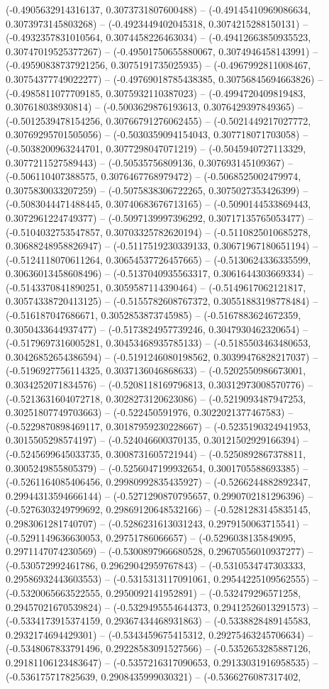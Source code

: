 (-0.4905632914316137, 0.3073731807600488) -- (-0.49145410969086634, 0.3073973145803268) -- (-0.4923449402045318, 0.3074215288150131) -- (-0.4932357831010564, 0.3074458226463034) -- (-0.49412663850935523, 0.30747019525377267) -- (-0.49501750655880067, 0.3074946458143991) -- (-0.49590838737921256, 0.3075191735025935) -- (-0.4967992811008467, 0.30754377749022277) -- (-0.49769018785438385, 0.30756845694663826) -- (-0.4985811077709185, 0.3075932110387023) -- (-0.4994720409819483, 0.307618038930814) -- (-0.5003629876193613, 0.3076429397849365) -- (-0.5012539478154256, 0.30766791276062455) -- (-0.5021449217027772, 0.30769295701505056) -- (-0.5030359094154043, 0.307718071703058) -- (-0.5038200963244701, 0.3077298047071219) -- (-0.5045940727113329, 0.3077211527589443) -- (-0.50535756809136, 0.307693145109367) -- (-0.506110407388575, 0.3076467768979472) -- (-0.5068525002479974, 0.3075830033207259) -- (-0.5075838306722265, 0.3075027353426399) -- (-0.5083044471488445, 0.30740683676713165) -- (-0.5090144533869443, 0.3072961224749377) -- (-0.5097139997396292, 0.30717135765053477) -- (-0.5104032753547857, 0.30703325782620194) -- (-0.5110825010685278, 0.30688248958826947) -- (-0.5117519230339133, 0.30671967180651194) -- (-0.5124118070611264, 0.30654537726457665) -- (-0.5130624336335599, 0.30636013458608496) -- (-0.5137040935563317, 0.3061644303669334) -- (-0.5143370841890251, 0.3059587114390464) -- (-0.5149617062121817, 0.30574338720413125) -- (-0.5155782608767372, 0.30551883198778484) -- (-0.516187047686671, 0.3052853873745985) -- (-0.5167883624672359, 0.3050433644937477) -- (-0.5173824957739246, 0.3047930462320654) -- (-0.5179697316005281, 0.30453468935785133) -- (-0.5185503463480653, 0.30426852654386594) -- (-0.5191246080198562, 0.30399476828217037) -- (-0.5196927756114325, 0.3037136046868633) -- (-0.5202550986673001, 0.3034252071834576) -- (-0.5208118169796813, 0.30312973008570776) -- (-0.5213631604072718, 0.3028273120623086) -- (-0.5219093487947253, 0.30251807749703663) -- (-0.522450591976, 0.3022021377467583) -- (-0.5229870898469117, 0.30187959230228667) -- (-0.5235190324941953, 0.3015505298574197) -- (-0.524046600370135, 0.30121502929166394) -- (-0.5245699645033735, 0.3008731605721944) -- (-0.5250892867378811, 0.3005249855805379) -- (-0.5256047199932654, 0.3001705588693385) -- (-0.5261164085406456, 0.29980992835435927) -- (-0.5266244882892347, 0.29944313594666144) -- (-0.5271290870795657, 0.2990702181296396) -- (-0.5276303249799692, 0.29869120648532166) -- (-0.5281283145835145, 0.2983061281740707) -- (-0.5286231613031243, 0.2979150063715541) -- (-0.5291149636630053, 0.29751786066657) -- (-0.5296038135849095, 0.2971147074230569) -- (-0.5300897966680528, 0.29670556010937277) -- (-0.530572992461786, 0.29629042959767843) -- (-0.5310534747303333, 0.29586932443603553) -- (-0.5315313117091061, 0.29544225109562555) -- (-0.5320065663522555, 0.2950092141952891) -- (-0.532479296571258, 0.29457021670539824) -- (-0.5329495554644373, 0.29412526013291573) -- (-0.5334173915374159, 0.29367434468931863) -- (-0.5338828489145583, 0.2932174694429301) -- (-0.5343459675415312, 0.29275463245706634) -- (-0.5348067833791496, 0.29228583091527566) -- (-0.5352653285887126, 0.29181106123483647) -- (-0.5357216317090653, 0.29133031916958535) -- (-0.536175717825639, 0.2908435999030321) -- (-0.5366276087317402, 
